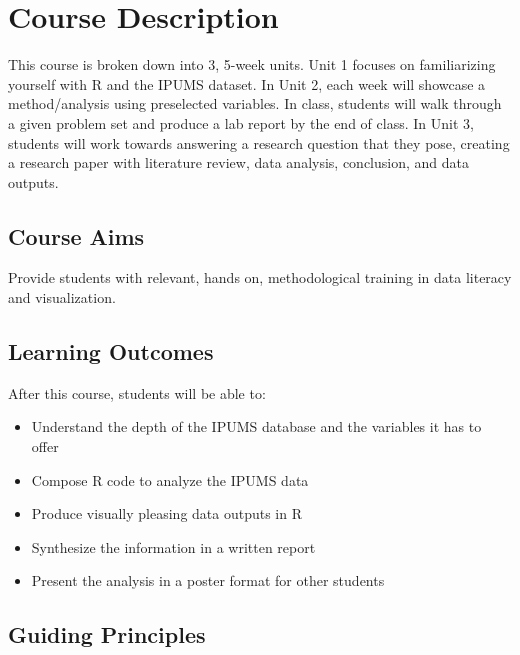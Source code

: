 \documentclass[
]{book}
\providecommand{\tightlist}{%
  \setlength{\itemsep}{0pt}\setlength{\parskip}{0pt}}
\begin{document}
\hypertarget{course-description}{%
\section*{Course Description}\label{course-description}}

This course is broken down into 3, 5-week units. Unit 1 focuses on familiarizing yourself with R and the IPUMS dataset. In Unit 2, each week will showcase a method/analysis using preselected variables. In class, students will walk through a given problem set and produce a lab report by the end of class. In Unit 3, students will work towards answering a research question that they pose, creating a research paper with literature review, data analysis, conclusion, and data outputs.

\hypertarget{course-aims}{%
\subsection*{Course Aims}\label{course-aims}}

Provide students with relevant, hands on, methodological training in data literacy and visualization.

\hypertarget{learning-outcomes}{%
\subsection*{Learning Outcomes}\label{learning-outcomes}}

After this course, students will be able to:

\begin{itemize}
\tightlist
\item
  Understand the depth of the IPUMS database and the variables it has to\\
  offer
\item
  Compose R code to analyze the IPUMS data
\item
  Produce visually pleasing data outputs in R
\item
  Synthesize the information in a written report
\item
  Present the analysis in a poster format for other students
\end{itemize}

\hypertarget{guiding-principles}{%
\subsection*{Guiding Principles}\label{guiding-principles}}
\end{document}
